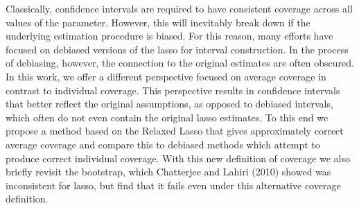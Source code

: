 Classically, confidence intervals are required to have consistent coverage across all values of the parameter. However, this will inevitably break down if the underlying estimation procedure is biased. For this reason, many efforts have focused on debiased versions of the lasso for interval construction. In the process of debiasing, however, the connection to the original estimates are often obscured. In this work, we offer a different perspective focused on average coverage in contrast to individual coverage. This perspective results in confidence intervals that better reflect the original assumptions, as opposed to debiased intervals, which often do not even contain the original lasso estimates. To this end we propose a method based on the Relaxed Lasso that gives approximately correct average coverage and compare this to debiased methods which attempt to produce correct individual coverage. With this new definition of coverage we also briefly revisit the bootstrap, which Chatterjee and Lahiri (2010) showed was inconsistent for lasso, but find that it fails even under this alternative coverage definition.



